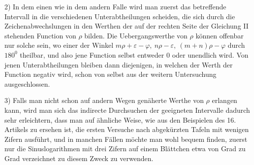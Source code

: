 2) In dem einen wie in dem andern Falle wird man zuerst das betreffende
Intervall in die verschiedenen Unterabtheilungen scheiden, die sich durch die
Zeichenabwechslungen in den Werthen der auf der rechten Seite der Gleichung
II stehenden Function von $\rho$ bilden. Die Uebergangswerthe von $\rho$ können offenbar nur solche sein, wo einer der Winkel $m\rho+\varepsilon-\varphi,\ n\rho-\varepsilon,\ (m+n)\rho-\varphi$
durch $180^{0}$ theilbar, und also jene Function selbst entweder $0$ oder unendlich
wird. Von jenen Unterabtheilungen bleiben dann diejenigen, in welchen der
Werth der Function negativ wird, schon von selbst aus der weitern Untersuchung
ausgeschlossen.

3) Falls man nicht schon auf andern Wegen genäherte Werthe von $\rho$ erlangen kann, wird man sich das indirecte Durchsuchen der geeigneten Intervalle
dadurch sehr erleichtern, dass man auf ähnliche Weise, wie aus den Beispielen
des 16. Artikels zu ersehen ist, die ersten Versuche nach abgekürzten Tafeln mit
wenigen Zifern ausführt, und in manchen Fällen möchte man wohl bequem
finden, zuerst nur die Sinuslogarithmen mit drei Zifern auf einem Blättchen etwa
von Grad zu Grad verzeichnet zu diesem Zweck zu verwenden.

